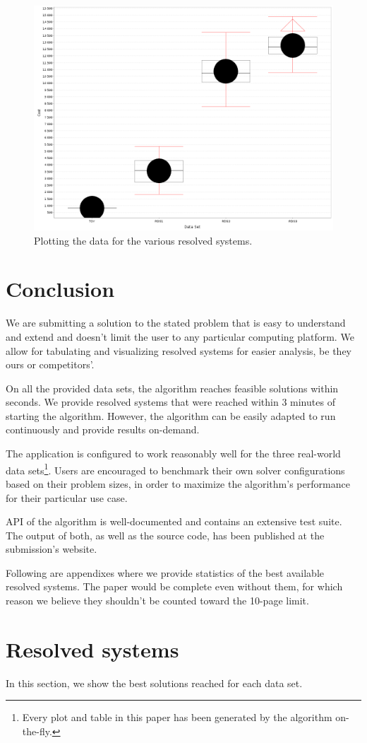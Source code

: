 \documentclass[10pt,a4paper,final]{article}
\begin{document}
\begin{figure}
\centering
\includegraphics[width=120mm]{chart.png}
\caption{Plotting the data for the various resolved systems.}
\label{figure:plot}
\end{figure}



\section{Conclusion}

We are submitting a solution to the stated problem that is easy to understand and extend and doesn't limit the user to any particular computing platform. We allow for tabulating and visualizing resolved systems for easier analysis, be they ours or competitors'.

On all the provided data sets, the algorithm reaches feasible solutions within seconds. We provide resolved systems that were reached within 3 minutes of starting the algorithm. However, the algorithm can be easily adapted to run continuously and provide results on-demand.

The application is configured to work reasonably well for the three real-world data sets\footnote{Every plot and table in this paper has been generated by the algorithm on-the-fly.}. Users are encouraged to benchmark their own solver configurations based on their problem sizes, in order to maximize the algorithm's performance for their particular use case.

API of the algorithm is well-documented and contains an extensive test suite. The output of both, as well as the source code, has been published at the submission's website.

\appendix

Following are appendixes where we provide statistics of the best available resolved systems. The paper would be complete even without them, for which reason we believe they shouldn't be counted toward the 10-page limit.

\section{Resolved systems}

In this section, we show the best solutions reached for each data set. 





\end{document}
